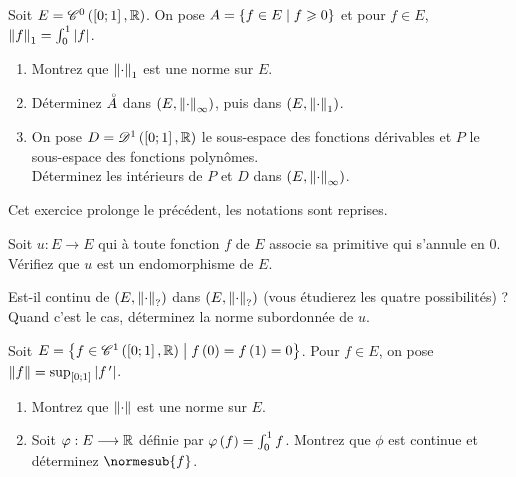 \begin{corr}
\end{corr}

\begin{exoss}[Exercice 11]
Soit \(E=\mathscr{C}^{0}\left(\left[0;1\right],\mathbb{R}\right)\). On pose \(A=\left\lbrace f\in E\;\middle|\; f\geqslant0\right\rbrace\) et pour \(f\in E\), \(\left\|f\right\|_1=\int_0^1\left\lvert f\right\rvert\).

\begin{enumerate}
    \item Montrez que \(\left\|\cdot\right\|_1\) est une norme sur \(E\). \\
    \item Déterminez \(\accentset{\circ}{A}\) dans \(\groupe{E}[\norme{\cdot}_\infty]\), puis dans \(\groupe{E}[\norme{\cdot}_1]\). \\
    \item On pose \(D=\mathscr{D}^1\left(\left[0;1\right],\mathbb{R}\right)\) le sous-espace des fonctions dérivables et \(P\) le sous-espace des fonctions polynômes. \\ Déterminez les intérieurs de \(P\) et \(D\) dans \(\groupe{E}[\norme{\cdot}_\infty]\).
\end{enumerate}
\end{exoss}

\begin{corr}
\end{corr}

\begin{exoss}[Exercice 12]
Cet exercice prolonge le précédent, les notations sont reprises.

Soit \(u:E\to E\) qui à toute fonction \(f\) de \(E\) associe sa primitive qui s'annule en \(0\). Vérifiez que \(u\) est un endomorphisme de \(E\).

Est-il continu de \(\groupe{E}[\norme{\cdot}_?]\) dans \(\groupe{E}[\norme{\cdot}_?]\) (vous étudierez les quatre possibilités) ? Quand c'est le cas, déterminez la norme subordonnée de \(u\).
\end{exoss}

\begin{corr}
\end{corr}

\begin{exopss}[Exercice 13]
Soit \(E=\left\lbrace f\in\mathscr{C}^{1}\left(\left[0;1\right],\mathbb{R}\right)\;\middle|\; f\left(0\right)=f\left(1\right)=0\right\rbrace\). Pour \(f\in E\), on pose \(\left\|f\right\|=\sup_{\left[0;1\right]}\left\lvert f^{\,\prime}\right\rvert\).

\begin{enumerate}
    \item Montrez que \(\left\|\cdot\right\|\) est une norme sur \(E\). \\
    \item Soit \(\varphi:E\longrightarrow\mathbb{R}\) définie par \(\varphi\left(f\right)=\int_0^1f\). Montrez que \(\phi\) est continue et déterminez \(\normesub{f}\).
\end{enumerate}
\end{exopss}

